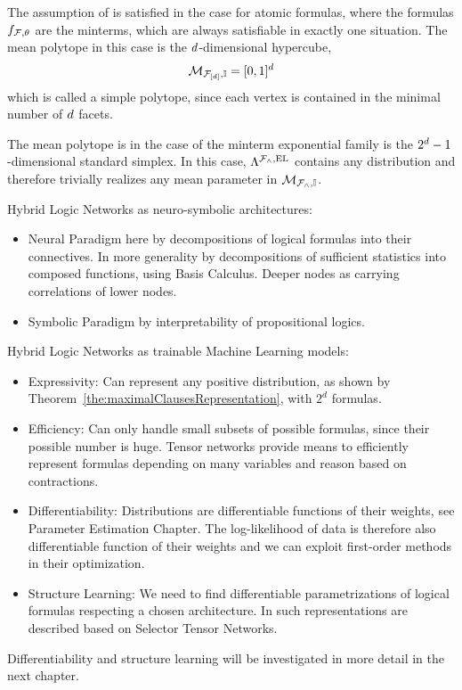 \begin{example}
	The assumption of  is satisfied in the case for atomic formulas, where the formulas  $f_{\mathcal{F},\theta}$ are the minterms, which are always satisfiable in exactly one situation.
	The mean polytope in this case is the $d$-dimensional hypercube,
		\[ \mathcal{M}_{\mathcal{F}_{[d]},\mathbb{I}} = [0,1]^{d} \]
	which is called a simple polytope, since each vertex is contained in the minimal number of $d$ facets.
\end{example}

\begin{example}
	The mean polytope is in the case of the minterm exponential family is the $2^d-1$-dimensional standard simplex.
	In this case, $\Lambda^{\mathcal{F}_{\land},\mathrm{EL}}$ contains any distribution and therefore trivially realizes any mean parameter in $\mathcal{M}_{\mathcal{F}_{\land},\mathbb{I}}$.
\end{example}





Hybrid Logic Networks as neuro-symbolic architectures:
\begin{itemize}
	\item Neural Paradigm here by decompositions of logical formulas into their connectives.
		In more generality by decompositions of sufficient statistics into composed functions, using Basis Calculus.
		Deeper nodes as carrying correlations of lower nodes.
	\item Symbolic Paradigm by interpretability of propositional logics.
\end{itemize}


Hybrid Logic Networks as trainable Machine Learning models:
\begin{itemize}
	\item Expressivity: Can represent any positive distribution, as shown by Theorem~\ref{the:maximalClausesRepresentation}, with $2^d$ formulas.
	\item Efficiency: Can only handle small subsets of possible formulas, since their possible number is huge.
		Tensor networks provide means to efficiently represent formulas depending on many variables and reason based on contractions.
	\item Differentiability: Distributions are differentiable functions of their weights, see Parameter Estimation Chapter. 
		The log-likelihood of data is therefore also differentiable function of their weights and we can exploit first-order methods in their optimization.
	\item Structure Learning: We need to find differentiable parametrizations of logical formulas respecting a chosen architecture.
		In  such representations are described based on Selector Tensor Networks.
\end{itemize}
Differentiability and structure learning will be investigated in more detail in the next chapter.

